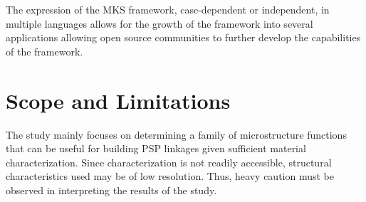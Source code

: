 The expression of the MKS framework, case-dependent or independent, in multiple languages allows for the growth of the framework into several applications allowing open source communities to further develop the capabilities of the framework.

\section{Scope and Limitations}
The study mainly focuses on determining a family of microstructure functions that can be useful for building PSP linkages given sufficient material characterization.
Since characterization is not readily accessible, structural characteristics used may be of low resolution.
Thus, heavy caution must be observed in interpreting the results of the study.
